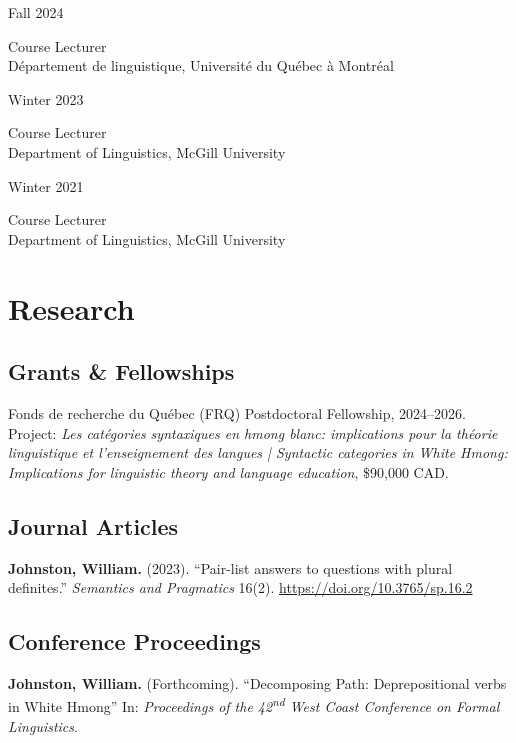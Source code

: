 \documentclass[11pt,oneside,DIV=8,parskip=off,letterpaper]{scrarticle} %
\newlength{\leftcolwidth}
\newlength{\mycolspace}
\newlength{\rightcolwidth}
\newlength{\spacingbefore}
\newlength{\spacingafter}
\newcommand{\myonecol}[1]{%
	\vspace{\spacingbefore}%
	\begin{minipage}[t]{\linewidth}%
		\strut#1%
	\end{minipage}%
	\vspace{\spacingafter}\par%
	}
\newcommand{\mytwocol}[2]{%
	\vspace{\spacingbefore}%
	\begin{minipage}[t]{\leftcolwidth}%
		\strut#1%
	\end{minipage}%
	\hspace{\mycolspace}%
	\begin{minipage}[t]{\rightcolwidth}%
		\strut#2%
	\end{minipage}%
	\vspace{\spacingafter}\par%
	}
\newcommand{\pub}[1]{%
	\myonecol{#1}%
	}
\newcommand{\cvline}[2]{%
	\mytwocol{#1}{#2}%
	}
\begin{document}
\cvline{Fall 2024}{Course Lecturer\\Département de linguistique, Université du Québec à Montréal}

\cvline{Winter 2023}{Course Lecturer\\Department of Linguistics, McGill University}

\cvline{Winter 2021}{Course Lecturer\\Department of Linguistics, McGill University}

\section{Research}

\subsection{Grants \& Fellowships}

\pub{Fonds de recherche du Québec (FRQ) Postdoctoral Fellowship, 2024--2026. Project: \textit{Les catégories syntaxiques en hmong blanc: implications pour la théorie linguistique et l'enseignement des langues | Syntactic categories in White Hmong: Implications for linguistic theory and language education}, \$90,000 CAD.}

\subsection{Journal Articles}

\pub{\textbf{Johnston, William.} (2023). ``Pair-list answers to questions with plural definites.'' \textit{Semantics and Pragmatics} 16(2). \href{https://doi.org/10.3765/sp.16.2}{https://doi.org/10.3765/sp.16.2}}


\subsection{Conference Proceedings}

\pub{\textbf{Johnston, William.} (Forthcoming). ``Decomposing Path: Deprepositional verbs in White Hmong'' In: \textit{Proceedings of the 42\textsuperscript{nd} West Coast Conference on Formal Linguistics}. %
}
\end{document}
